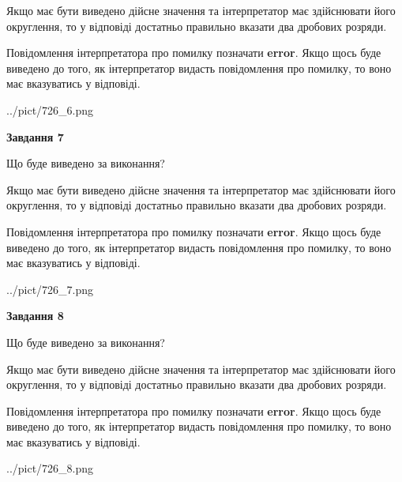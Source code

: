 \documentclass[12pt, ukrainian]{article}
\begin{document}
{\begin {Large}
Якщо має бути виведено дійсне значення та інтерпретатор має здійснювати його округлення, 
то у відповіді достатньо правильно вказати два дробових розряди.

Повідомлення інтерпретатора про помилку позначати \textbf{error}.
Якщо щось буде виведено до того, як інтерпретатор видасть повідомлення про помилку, 
то воно має вказуватись у відповіді. \par

\begin{center}
	{../pict/726_6.png}
\end{center}
\newpage

{\begin {center}\textbf{Завдання 7}\end {center}}\par
Що буде виведено за виконання? \par

Якщо має бути виведено дійсне значення та інтерпретатор має здійснювати його округлення, 
то у відповіді достатньо правильно вказати два дробових розряди.

Повідомлення інтерпретатора про помилку позначати \textbf{error}.
Якщо щось буде виведено до того, як інтерпретатор видасть повідомлення про помилку, 
то воно має вказуватись у відповіді. \par

\begin{center}
	{../pict/726_7.png}
\end{center}
\newpage

{\begin {center}\textbf{Завдання 8}\end {center}}\par
Що буде виведено за виконання? \par

Якщо має бути виведено дійсне значення та інтерпретатор має здійснювати його округлення, 
то у відповіді достатньо правильно вказати два дробових розряди.

Повідомлення інтерпретатора про помилку позначати \textbf{error}.
Якщо щось буде виведено до того, як інтерпретатор видасть повідомлення про помилку, 
то воно має вказуватись у відповіді. \par

\begin{center}
	{../pict/726_8.png}
\end{center}
\newpage


\end{Large}}
\end{document}
